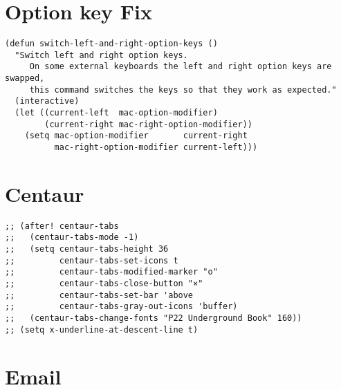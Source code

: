 \documentclass[c]{article}
\theoremstyle{plain}%
\theoremstyle{definition}
\theoremstyle{remark}
\begin{document}
\section{Option key Fix}
\label{sec:org5972c7e}
\begin{verbatim}
(defun switch-left-and-right-option-keys ()
  "Switch left and right option keys.
     On some external keyboards the left and right option keys are swapped,
     this command switches the keys so that they work as expected."
  (interactive)
  (let ((current-left  mac-option-modifier)
        (current-right mac-right-option-modifier))
    (setq mac-option-modifier       current-right
          mac-right-option-modifier current-left)))
\end{verbatim}

\section{Centaur}
\label{sec:orgf277900}
\begin{verbatim}
;; (after! centaur-tabs
;;   (centaur-tabs-mode -1)
;;   (setq centaur-tabs-height 36
;;         centaur-tabs-set-icons t
;;         centaur-tabs-modified-marker "o"
;;         centaur-tabs-close-button "×"
;;         centaur-tabs-set-bar 'above
;;         centaur-tabs-gray-out-icons 'buffer)
;;   (centaur-tabs-change-fonts "P22 Underground Book" 160))
;; (setq x-underline-at-descent-line t)
\end{verbatim}

\section{Email}
\label{sec:orgb2f647d}
\end{document}
